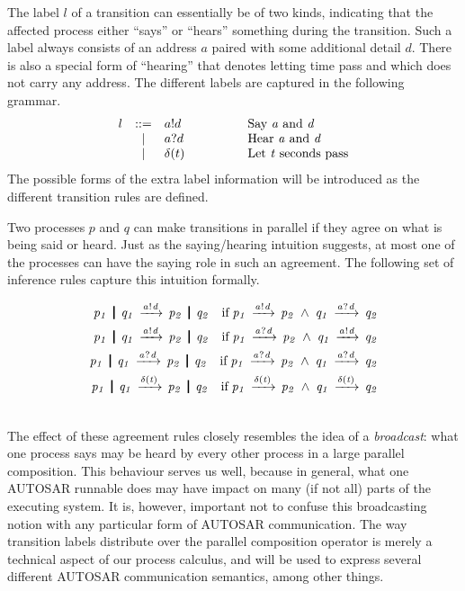 \documentclass[twocolumn]{article}
\begin{document}
The label $l$ of a transition can essentially be of two kinds, indicating that the affected process either ``says'' or ``hears'' something during the transition. Such a label always consists of an address $a$ paired with some additional detail $d$. There is also a special form of ``hearing'' that denotes letting time pass and which does not carry any address. The different labels are captured in the following grammar.
\[
\begin{array}{rcll}
  l         & ::= & a!d       & \hspace{4em}\text{Say  \V{A} and \V{D}}   \\
            & |   & a?d       & \hspace{4em}\text{Hear \V{A} and \V{D}}   \\
            & |   & \Tdelta t & \hspace{4em}\text{Let \V{T} seconds pass} \\
\end{array}
\]
The possible forms of the extra label information  will be introduced as the different transition rules are defined.

Two processes $p$ and $q$ can make transitions in parallel if they agree on what is being said or heard. Just as the saying/hearing intuition suggests, at most one of the processes can have the saying role in such an agreement. The following set of inference rules capture this intuition formally.
{
\renewcommand{\Prule}[2]{#1 \quad \Pif\; #2\\}
\renewcommand{\Tstep}[3]{#1 \red{#2} #3}
\renewcommand\Pcomma{\;\wedge\;}

\begin{eqnarray}  \CombRed  \notag \end{eqnarray}
}


The effect of these agreement rules closely resembles the idea of a \emph{broadcast}: what one process says may be heard by every other process in a large parallel composition. This behaviour serves us well, because in general, what one AUTOSAR runnable does may have impact on many (if not all) parts of the executing system. It is, however, important not to confuse this broadcasting notion with any particular form of AUTOSAR communication. The way transition labels distribute over the parallel composition operator is merely a technical aspect of our process calculus, and will be used to express several different AUTOSAR communication semantics, among other things.
\end{document}
